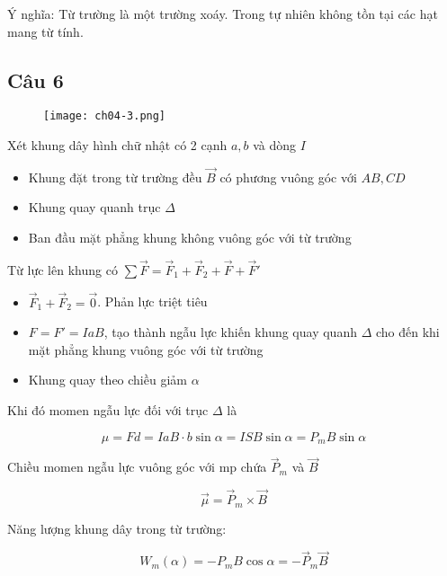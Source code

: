 Ý nghĩa: Từ trường là một trường xoáy. Trong tự nhiên không tồn tại các hạt mang từ tính.

\subsection{Câu 6}

\begin{figure}[h]
  \centering
  \texttt{[image: ch04-3.png]}
\end{figure}

Xét khung dây hình chữ nhật có 2 cạnh $a, b$ và dòng $I$

\begin{itemize}
  \item Khung đặt trong từ trường đều $\vec{B}$ có phương vuông góc với $AB, CD$
  \item Khung quay quanh trục $\Delta$
  \item Ban đầu mặt phẳng khung không vuông góc với từ trường
\end{itemize}

Từ lực lên khung có $\sum \vec{F} = \vec{F}_1 + \vec{F}_2 + \vec{F} + \vec{F}'$

\begin{itemize}
  \item $\vec{F}_1 + \vec{F}_2 = \vec{0}$. Phản lực triệt tiêu 
  \item $F = F' = IaB$, tạo thành ngẫu lực khiến khung quay quanh $\Delta$ cho đến khi mặt phẳng khung vuông góc với từ trường
  \item Khung quay theo chiều giảm $\alpha$
\end{itemize}

Khi đó momen ngẫu lực đối với trục $\Delta$ là 

\begin{equation*}
  \mu = Fd = IaB \cdot b\sin\alpha = ISB\sin\alpha = P_m B \sin\alpha
\end{equation*}

Chiều momen ngẫu lực vuông góc với mp chứa $\vec{P}_m$ và $\vec{B}$

\begin{equation*}
  \vec{\mu} = \vec{P}_m \times \vec{B}
\end{equation*}

Năng lượng khung dây trong từ trường:

\begin{equation*}
  W_m(\alpha) = -P_mB\cos\alpha = -\vec{P}_m\vec{B}
\end{equation*}


